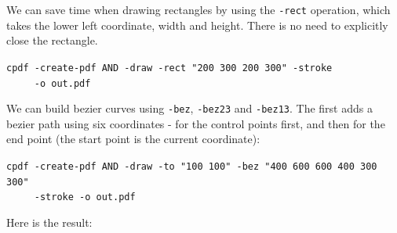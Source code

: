\documentclass{book}
\begin{document}
We can save time when drawing rectangles by using the \texttt{-rect} operation, which takes the lower left coordinate, width and height. There is no need to explicitly close the rectangle.

\begin{framed}
 \noindent\small\verb?cpdf -create-pdf AND -draw -rect "200 300 200 300" -stroke?\\
 \noindent\small\verb?     -o out.pdf?
\end{framed}

\noindent We can build bezier curves using \texttt{-bez}, \texttt{-bez23} and \texttt{-bez13}. The first adds a bezier path using six coordinates - for the control points first, and then for the end point (the start point is the current coordinate):

\begin{framed}
 \noindent\small\verb?cpdf -create-pdf AND -draw -to "100 100" -bez "400 600 600 400 300 300"?\\
 \noindent\small\verb?     -stroke -o out.pdf?
\end{framed}

\noindent Here is the result:
\end{document}
